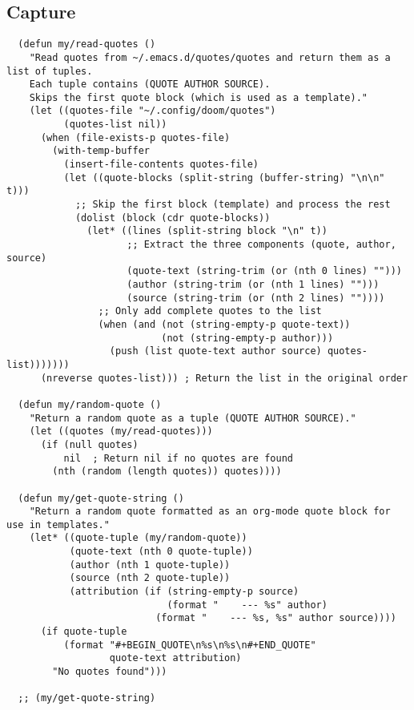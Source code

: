 \documentclass[11pt]{article}
\begin{document}
\subsection{Capture}
\label{sec:org23553f1}
\begin{verbatim}
  (defun my/read-quotes ()
    "Read quotes from ~/.emacs.d/quotes/quotes and return them as a list of tuples.
    Each tuple contains (QUOTE AUTHOR SOURCE).
    Skips the first quote block (which is used as a template)."
    (let ((quotes-file "~/.config/doom/quotes")
          (quotes-list nil))
      (when (file-exists-p quotes-file)
        (with-temp-buffer
          (insert-file-contents quotes-file)
          (let ((quote-blocks (split-string (buffer-string) "\n\n" t)))
            ;; Skip the first block (template) and process the rest
            (dolist (block (cdr quote-blocks))
              (let* ((lines (split-string block "\n" t))
                     ;; Extract the three components (quote, author, source)
                     (quote-text (string-trim (or (nth 0 lines) "")))
                     (author (string-trim (or (nth 1 lines) "")))
                     (source (string-trim (or (nth 2 lines) ""))))
                ;; Only add complete quotes to the list
                (when (and (not (string-empty-p quote-text))
                           (not (string-empty-p author)))
                  (push (list quote-text author source) quotes-list)))))))
      (nreverse quotes-list))) ; Return the list in the original order

  (defun my/random-quote ()
    "Return a random quote as a tuple (QUOTE AUTHOR SOURCE)."
    (let ((quotes (my/read-quotes)))
      (if (null quotes)
          nil  ; Return nil if no quotes are found
        (nth (random (length quotes)) quotes))))

  (defun my/get-quote-string ()
    "Return a random quote formatted as an org-mode quote block for use in templates."
    (let* ((quote-tuple (my/random-quote))
           (quote-text (nth 0 quote-tuple))
           (author (nth 1 quote-tuple))
           (source (nth 2 quote-tuple))
           (attribution (if (string-empty-p source)
                            (format "    --- %s" author)
                          (format "    --- %s, %s" author source))))
      (if quote-tuple
          (format "#+BEGIN_QUOTE\n%s\n%s\n#+END_QUOTE"
                  quote-text attribution)
        "No quotes found")))

  ;; (my/get-quote-string)
\end{verbatim}
\end{document}
